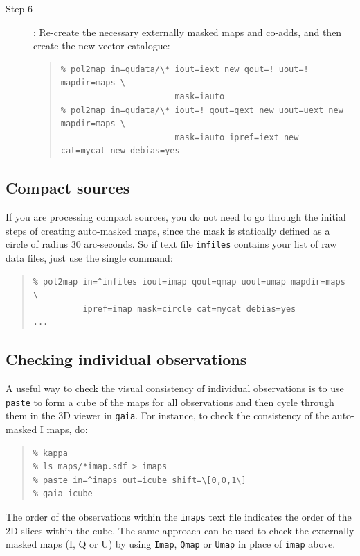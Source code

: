 \documentclass[twoside,11pt]{starlink}
\begin{document}
\begin{description}
\item[Step 6]: Re-create the necessary externally masked maps and co-adds,
and then create the new vector catalogue:

\begin{quote}
\begin{verbatim}
% pol2map in=qudata/\* iout=iext_new qout=! uout=! mapdir=maps \
                       mask=iauto
% pol2map in=qudata/\* iout=! qout=qext_new uout=uext_new mapdir=maps \
                       mask=iauto ipref=iext_new cat=mycat_new debias=yes
\end{verbatim}
\end{quote}

\end{description}

\subsection{Compact sources}
If you are processing compact sources, you do not need to go through the
initial steps of creating auto-masked maps, since the mask is statically
defined as a circle of radius 30 arc-seconds. So if text file
\texttt{infiles} contains your list of raw data files, just use the
single command:

\begin{quote}
\begin{verbatim}
% pol2map in=^infiles iout=imap qout=qmap uout=umap mapdir=maps \
          ipref=imap mask=circle cat=mycat debias=yes
...
\end{verbatim}
\end{quote}

\subsection{Checking individual observations}
A useful way to check the visual consistency of individual observations
is to use \texttt{paste} to form a cube of the maps for all observations and
then cycle through
them in the 3D viewer in \texttt{gaia}. For instance, to check the
consistency of the auto-masked I maps, do:

\begin{quote}
\begin{verbatim}
% kappa
% ls maps/*imap.sdf > imaps
% paste in=^imaps out=icube shift=\[0,0,1\]
% gaia icube
\end{verbatim}
\end{quote}

The order of the observations within the \texttt{imaps} text file
indicates the order of the 2D slices within the cube. The same approach
can be used to check the externally masked maps (I, Q or U) by using
\texttt{Imap}, \texttt{Qmap} or \texttt{Umap} in place of \texttt{imap}
above.
\end{document}

